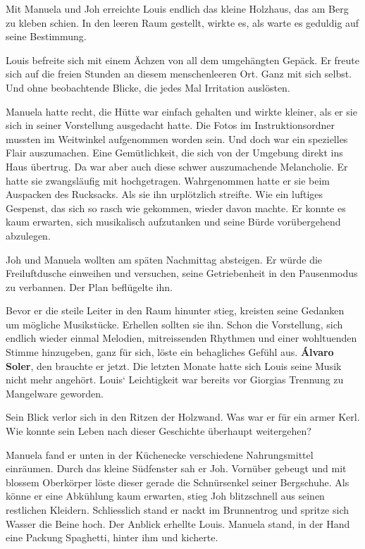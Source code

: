 Mit Manuela und Joh erreichte Louis endlich das kleine Holzhaus, das am
Berg zu kleben schien. In den leeren Raum gestellt, wirkte es, als warte
es geduldig auf seine Bestimmung.

Louis befreite sich mit einem Ächzen von all dem umgehängten Gepäck. Er
freute sich auf die freien Stunden an diesem menschenleeren Ort. Ganz
mit sich selbst. Und ohne beobachtende Blicke, die jedes Mal Irritation
auslösten.

Manuela hatte recht, die Hütte war einfach gehalten und wirkte kleiner,
als er sie sich in seiner Vorstellung ausgedacht hatte. Die Fotos im
Instruktionsordner mussten im Weitwinkel aufgenommen worden sein. Und
doch war ein spezielles Flair auszumachen. Eine Gemütlichkeit, die sich
von der Umgebung direkt ins Haus übertrug. Da war aber auch diese schwer
auszumachende Melancholie. Er hatte sie zwangsläufig mit hochgetragen.
Wahrgenommen hatte er sie beim Auspacken des Rucksacks. Als sie ihn
urplötzlich streifte. Wie ein luftiges Gespenst, das sich so rasch wie
gekommen, wieder davon machte. Er konnte es kaum erwarten, sich
musikalisch aufzutanken und seine Bürde vorübergehend abzulegen.

Joh und Manuela wollten am späten Nachmittag absteigen. Er würde die
Freiluftdusche einweihen und versuchen, seine Getriebenheit in den
Pausenmodus zu verbannen. Der Plan beflügelte ihn.

Bevor er die steile Leiter in den Raum hinunter stieg, kreisten seine
Gedanken um mögliche Musikstücke. Erhellen sollten sie ihn. Schon die
Vorstellung, sich endlich wieder einmal Melodien, mitreissenden Rhythmen
und einer wohltuenden Stimme hinzugeben, ganz für sich, löste ein
behagliches Gefühl aus. \textbf{Álvaro Soler}, den brauchte er jetzt.
Die letzten Monate hatte sich Louis seine Musik nicht mehr angehört.
Louis` Leichtigkeit war bereits vor Giorgias Trennung zu Mangelware
geworden.

Sein Blick verlor sich in den Ritzen der Holzwand. Was war er für ein
armer Kerl. Wie konnte sein Leben nach dieser Geschichte überhaupt
weitergehen?

Manuela fand er unten in der Küchenecke verschiedene Nahrungsmittel
einräumen. Durch das kleine Südfenster sah er Joh. Vornüber gebeugt und
mit blossem Oberkörper löste dieser gerade die Schnürsenkel seiner
Bergschuhe. Als könne er eine Abkühlung kaum erwarten, stieg Joh
blitzschnell aus seinen restlichen Kleidern. Schliesslich stand er nackt
im Brunnentrog und spritze sich Wasser die Beine hoch. Der Anblick
erhellte Louis. Manuela stand, in der Hand eine Packung Spaghetti,
hinter ihm und kicherte.

